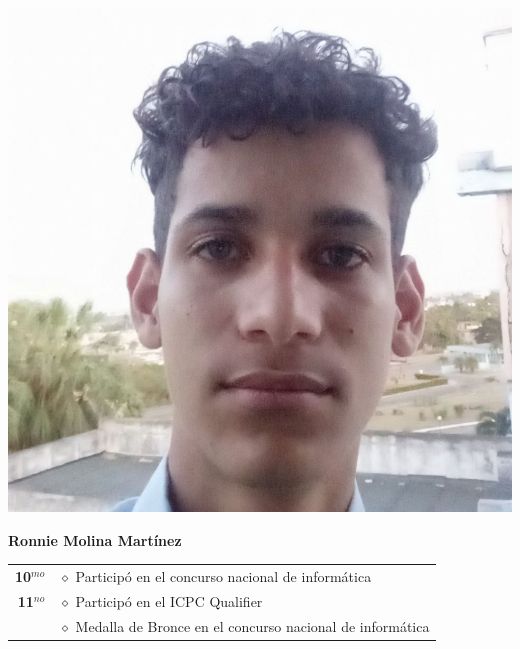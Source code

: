 \begin{minipage}{0.2\textwidth}
	\includegraphics[width=\linewidth]{img/concursantes/ronnie.png} %
\end{minipage}
\hfill
\begin{minipage}{0.7\textwidth}
	\textbf{Ronnie Molina Martínez}
	
	\vspace*{0.1in}
	\begin{tabular}{rl}
		
		\textbf{10$^{mo}$} & $\diamond$ Participó en el concurso nacional de informática \\
		
		\textbf{11$^{no}$} 
		& $\diamond$ Participó en el ICPC Qualifier \\
		& $\diamond$ Medalla de Bronce en el concurso nacional de informática \\
		
		
		
	\end{tabular}
\end{minipage}

\vspace*{0.2in}

